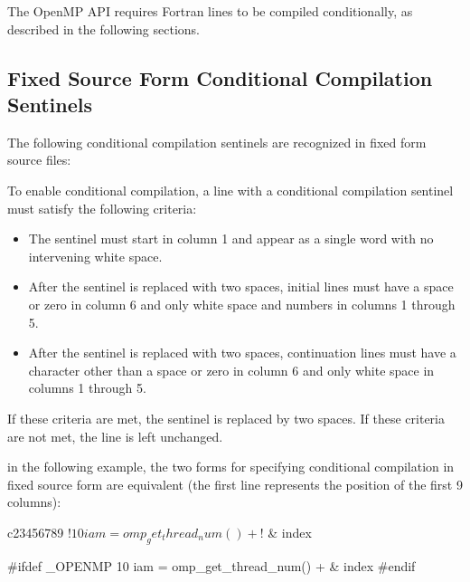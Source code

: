 \begin{fortranspecific}
The OpenMP API requires Fortran lines to be compiled conditionally, as described in
the following sections.




\subsection{Fixed Source Form Conditional Compilation Sentinels}
\label{subsec:Fixed Source Form Conditional Compilation Sentinels}
The following conditional compilation sentinels are recognized in fixed form source
files:


To enable conditional compilation, a line with a conditional compilation sentinel must
satisfy the following criteria:

\begin{itemize}
\item The sentinel must start in column 1 and appear as a single word with no intervening
white space.

\item After the sentinel is replaced with two spaces, initial lines must have a space or zero
in column 6 and only white space and numbers in columns 1 through 5.

\item After the sentinel is replaced with two spaces, continuation lines must have a
character other than a space or zero in column 6 and only white space in columns 1
through 5.
\end{itemize}

If these criteria are met, the sentinel is replaced by two spaces. If these criteria are not
met, the line is left unchanged.

\begin{note}
in the following example, the two forms for specifying conditional compilation
in fixed source form are equivalent (the first line represents the position of the first 9
columns):

\begin{ompfPragma}
c23456789
!$ 10 iam = omp_get_thread_num() +
!$   &          index

#ifdef _OPENMP
   10 iam = omp_get_thread_num() +
     &            index
#endif
\end{ompfPragma}
\end{note}






\end{fortranspecific}
